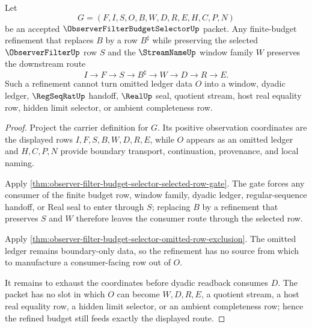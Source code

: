 \begin{theorem}
\label{thm:observer-filter-budget-selector-budget-refinement-nonescape}
Let
$$
G=(F,I,S,O,B,W,D,R,E,H,C,P,N)
$$
be an accepted $\ObserverFilterBudgetSelectorUp$ packet. Any finite-budget refinement that replaces $B$ by a row $B^\sharp$ while preserving the selected $\ObserverFilterUp$ row $S$ and the $\StreamNameUp$ window family $W$ preserves the downstream route
$$
I \to F \to S \to B^\sharp \to W \to D \to R \to E.
$$
Such a refinement cannot turn omitted ledger data $O$ into a window, dyadic ledger, $\RegSeqRatUp$ handoff, $\RealUp$ seal, quotient stream, host real equality row, hidden limit selector, or ambient completeness row.
\end{theorem}
\begin{proof}
Project the carrier definition for $G$. Its positive observation coordinates are the displayed rows $I,F,S,B,W,D,R,E$, while $O$ appears as an omitted ledger and $H,C,P,N$ provide boundary transport, continuation, provenance, and local naming.

Apply \autoref{thm:observer-filter-budget-selector-selected-row-gate}. The gate forces any consumer of the finite budget row, window family, dyadic ledger, regular-sequence handoff, or Real seal to enter through $S$; replacing $B$ by a refinement that preserves $S$ and $W$ therefore leaves the consumer route through the selected row.

Apply \autoref{thm:observer-filter-budget-selector-omitted-row-exclusion}. The omitted ledger remains boundary-only data, so the refinement has no source from which to manufacture a consumer-facing row out of $O$.

It remains to exhaust the coordinates before dyadic readback consumes $D$. The packet has no slot in which $O$ can become $W,D,R,E$, a quotient stream, a host real equality row, a hidden limit selector, or an ambient completeness row; hence the refined budget still feeds exactly the displayed route.
\end{proof}

